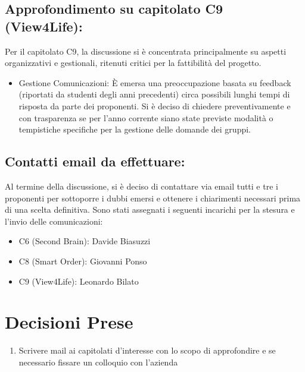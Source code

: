 \subsection{Approfondimento su capitolato C9 (View4Life):}
Per il capitolato C9, la discussione si è concentrata principalmente su aspetti organizzativi e gestionali, ritenuti critici per la fattibilità del progetto.
\begin{itemize}
    \item Gestione Comunicazioni: È emersa una preoccupazione basata su feedback (riportati da studenti degli anni precedenti) circa possibili lunghi tempi di risposta da parte dei proponenti. Si è deciso di chiedere preventivamente e con trasparenza se per l'anno corrente siano state previste modalità o tempistiche specifiche per la gestione delle domande dei gruppi.
\end{itemize}
\subsection{Contatti email da effettuare:}
Al termine della discussione, si è deciso di contattare via email tutti e tre i proponenti per sottoporre i dubbi emersi e ottenere i chiarimenti necessari prima di una scelta definitiva.
Sono stati assegnati i seguenti incarichi per la stesura e l'invio delle comunicazioni:

\begin{itemize}
    \item C6 (Second Brain): Davide Biasuzzi
    \item C8 (Smart Order): Giovanni Ponso
    \item C9 (View4Life): Leonardo Bilato
\end{itemize}
\newpage
\section{Decisioni Prese}

\begin{enumerate}
    \item Scrivere mail ai capitolati d'interesse con lo scopo di approfondire e se necessario fissare un colloquio con l'azienda
\end{enumerate}

\newpage
